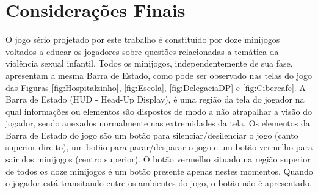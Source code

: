 \section{Considerações Finais}\label{sec:fim}

O jogo sério projetado por este trabalho é constituído por doze minijogos voltados a educar os jogadores sobre questões relacionadas a temática da violência sexual infantil. Todos os minijogos, independentemente de sua fase, apresentam a mesma Barra de Estado, como pode ser observado nas telas do jogo das Figuras \ref{fig:Hospitalzinho}, \ref{fig:Escola}, \ref{fig:DelegaciaDP} e \ref{fig:Cibercafe}. A Barra de Estado (HUD - Head-Up Display), é uma região da tela do jogador na qual informações ou elementos são dispostos de modo a não atrapalhar a visão do jogador, sendo anexados normalmente nas extremidades da tela. Os elementos da Barra de Estado do jogo são um botão para silenciar/desilenciar o jogo (canto superior direito), um botão para parar/desparar o jogo e um botão vermelho para sair dos minijogos (centro superior). O botão vermelho situado na região superior de todos os doze minijogos é um botão presente apenas nestes momentos. Quando o jogador está transitando entre os ambientes do jogo, o botão não é apresentado. 


